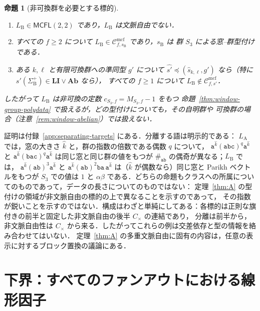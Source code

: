 \documentclass[11pt,a4paper]{ltjsarticle}
\numberwithin{equation}{section}
\theoremstyle{plain}
\newtheorem{proposition}[theorem]{命題}
\theoremstyle{definition}
\theoremstyle{remark}
\newcommand{\Cmcf}[2]{\mathcal{C}^{\mathrm{mcf}}_{#1,#2}}
\theoremstyle{plain}
\begin{document}
\begin{proposition}[非可換群を必要とする標的]
\label{prop:nonabelian-needed-target}
\begin{enumerate}[label=\textup{(\roman*)},leftmargin=*]
\item $L_{\mathrm B}\in\mathsf{MCFL}(2,2)$ であり，$L_{\mathrm B}$ は文脈自由でない．
\item すべての $f\ge2$ について $L_{\mathrm B}\in\Cmcf{f}{s_{\mathrm B}}$ であり，$s_{\mathrm B}$ は
群 $S_3$ による窓--群型付けである．
\item ある $k,\ell$ と有限\emph{可換}群への準同型 $g'$ について
$\widehat{s'}\preceq(\widehat s_{k,\ell},g')$ なら（特に
$s'(\Sigma_{\mathrm B}^+)\in\mathbf{LI}\vee\mathbf{Ab}$ なら），
すべての $f\ge1$ について $L_{\mathrm B}\notin\Cmcf{f}{s'}$．
\end{enumerate}
したがって $L_{\mathrm B}$ は非可換の定数 $c_{S_3,f}=M_{S_3,f}-1$ をもつ
命題~\ref{thm:window-group-polydata} で扱えるが，どの型付けについても，その自明群や
可換群の場合（注意~\ref{rem:window-abelian}）では扱えない．
\end{proposition}

証明は付録~\ref{app:separating-targets} にある．分離する語は明示的である：
$L_{\mathrm A}$ では，窓の大きさ $\hat k$ と，群の指数の倍数である偶数 $q$ について，
$\mathtt a^{\hat k}(\mathtt{abc})^q\mathtt a^{\hat k}$ と
$\mathtt a^{\hat k}(\mathtt{bac})^q\mathtt a^{\hat k}$ は同じ窓と同じ群の値をもつが
$\#_{\mathtt{ab}}$ の偶奇が異なる；$L_{\mathrm B}$ では，
$\mathtt a^{\hat k}(\mathtt{ab})^3\mathtt a^{\hat k}$ と
$\mathtt a^{\hat k}(\mathtt{ab})^2\mathtt{ba}\,\mathtt a^{\hat k}$ は（$\hat k$ が偶数なら）同じ窓と Parikh ベクトルをもつが
$S_3$ での値は $1$ と $\alpha\beta$ である．どちらの命題もクラスへの所属についてのものであって，データの長さについてのものではない：
定理~\ref{thm:A} の型付けの領域が非文脈自由の標的の上で異なることを示すのであって，
その指数が鋭いことを示すのではない．構成はわざと単純にしてある：各標的は正則な旗付きの前半と固定した非文脈自由の後半 $C_\times$ の連結であり，
分離は前半から，非文脈自由性は $C_\times$ から来る．したがってこれらの例は交差依存と型の情報を絡み合わせてはいない．
定理~\ref{thm:A} の多重文脈自由に固有の内容は，任意の表示に対するブロック置換の議論にある．

\section{下界：すべてのファンアウトにおける線形因子}
\label{sec:linear}
\end{document}
